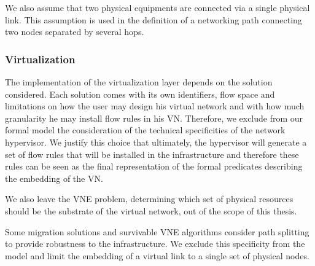 We also assume that two physical equipments are connected via a single physical link. This assumption is used in the definition of a networking path connecting two nodes separated by several hops.

\subsubsection{Virtualization}
The implementation of the virtualization layer depends on the solution considered.
Each solution comes with its own identifiers, flow space and limitations on how the user may design his virtual network and with how much granularity he may install flow rules in his VN. Therefore, we exclude from our formal model the consideration of the technical specificities of the network hypervisor.
We justify this choice that ultimately, the hypervisor will generate a set of flow rules that will be installed in the infrastructure and therefore these rules can be seen as the final representation of the formal predicates describing the embedding of the VN.

We also leave the VNE problem, \ie determining which set of physical resources should be the substrate of the virtual network, out of the scope of this thesis.

Some migration solutions and survivable VNE algorithms consider path splitting to provide robustness to the infrastructure.
We exclude this specificity from the model and limit the embedding of a virtual link to a single set of physical nodes.
